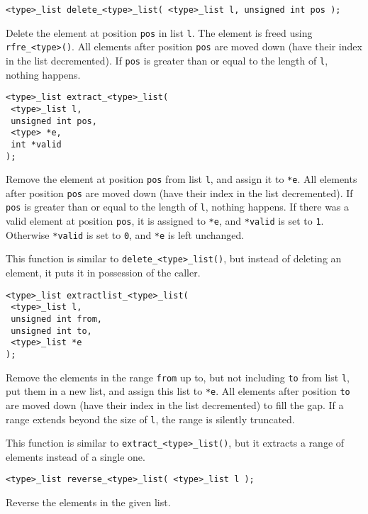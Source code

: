 \begin{verbatim}
<type>_list delete_<type>_list( <type>_list l, unsigned int pos );
\end{verbatim}
\begin{desc}
Delete the element at position {\tt pos} in list {\tt l}.
The element is freed using {\tt rfre\_<type>()}.
All elements after position {\tt pos} are moved down
(have their index in the list decremented).
If {\tt pos} is greater than or equal to the length of {\tt l},
nothing happens.
\end{desc}
\begin{verbatim}
<type>_list extract_<type>_list(
 <type>_list l,
 unsigned int pos,
 <type> *e,
 int *valid
);
\end{verbatim}
\begin{desc}
Remove the element at position {\tt pos} from list {\tt l},
and assign it to \verb'*e'.
All elements after position {\tt pos} are moved down
(have their index in the list decremented).
If {\tt pos} is greater than or equal to the length of {\tt l},
nothing happens.
If there was a valid element at position {\tt pos}, it is assigned
to \verb'*e', and \verb'*valid' is set to {\tt 1}. Otherwise
\verb'*valid' is set to {\tt 0}, and \verb'*e' is left unchanged.
\par
This function is similar to \verb'delete_<type>_list()', but instead
of deleting an element, it puts it in possession of the caller.
\end{desc}
\begin{verbatim}
<type>_list extractlist_<type>_list(
 <type>_list l,
 unsigned int from,
 unsigned int to,
 <type>_list *e
);
\end{verbatim}
\begin{desc}
Remove the elements in the range {\tt from} up to, but not including {\tt to} from list {\tt l},
put them in a new list, and assign this list to \verb'*e'.
All elements after position {\tt to} are moved down
(have their index in the list decremented) to fill the gap.
If a range extends beyond the size of {\tt l}, the range is silently
truncated.
\par
This function is similar to \verb'extract_<type>_list()', but it
extracts a range of elements instead of a single one.
\end{desc}
\begin{verbatim}
<type>_list reverse_<type>_list( <type>_list l );
\end{verbatim}
\begin{desc}
Reverse the elements in the given list.
\end{desc}
